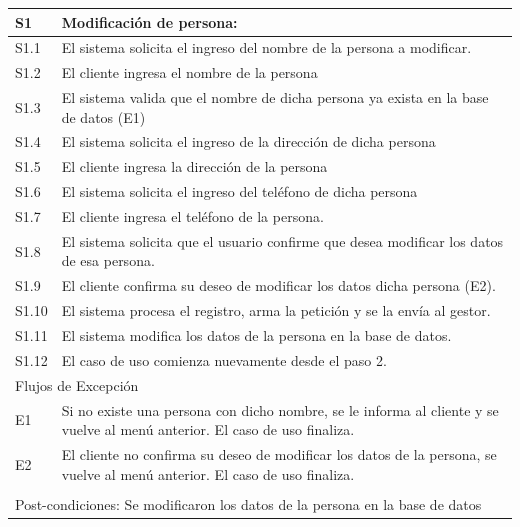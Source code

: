 \documentclass[11pt]{article}
\begin{document}
\begin{tabular}{|l|m{}|}
    S1 &  Modificaci\'on de persona: \\ \hline
    S1.1 & El sistema solicita el ingreso del nombre de la persona a modificar.\\ \hline
    S1.2 & El cliente ingresa el nombre de la persona\\ \hline
    S1.3 & El sistema valida que el nombre de dicha persona ya exista en la base de datos (E1) \\ \hline
    S1.4 & El sistema solicita el ingreso de la direcci\'on de dicha persona\\ \hline
    S1.5 & El cliente ingresa la direcci\'on de la persona\\ \hline
    S1.6 & El sistema solicita el ingreso del tel\'efono de dicha persona\\ \hline
    S1.7 & El cliente ingresa el tel\'efono de la persona.\\ \hline
    S1.8 & El sistema solicita que el usuario confirme que desea modificar los datos de esa persona.\\ \hline
    S1.9 & El cliente confirma su deseo de modificar los datos dicha persona (E2).\\ \hline
    S1.10 & El sistema procesa el registro, arma la petici\'on y se la env\'ia al gestor.\\ \hline
    S1.11 & El sistema modifica los datos de la persona en la base de datos.\\ \hline
    S1.12 & El caso de uso comienza nuevamente desde el paso 2.\\ \hline
    
    \multicolumn{2}{|l|}{Flujos de Excepción} \\
    \hline
  
    E1 & Si no existe una persona con dicho nombre, se le informa al cliente y se vuelve al men\'u anterior. 
    El caso de uso finaliza.\\
    E2 & El cliente no confirma su deseo de modificar los datos de la persona, se vuelve al men\'u anterior. 
    El caso de uso finaliza.\\
    
    \hline
    \multicolumn{2}{|l|}{\rowcolor[gray]{.5}} \\
    \hline
  
    \multicolumn{2}{|m{0.9\textwidth}|}{Post-condiciones: Se modificaron los datos de la persona en la base de datos} \\
  
    \hline
  \end{tabular}
  \newline
\end{document}

